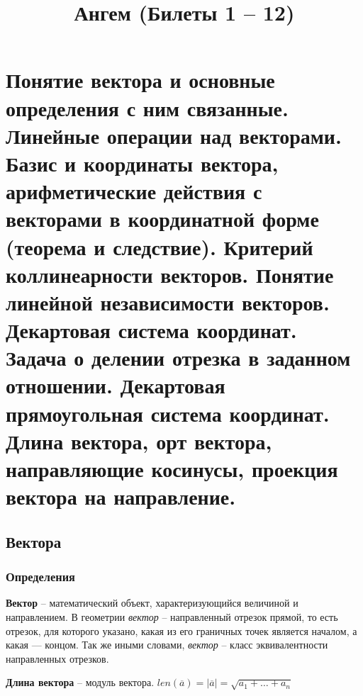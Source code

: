 \documentclass{article}
\title{Ангем (Билеты 1 -- 12)}
\begin{document}
\maketitle 
\tableofcontents

\newpage
\section{Понятие вектора и основные определения с ним связанные. Линейные операции над векторами. Базис и координаты вектора, арифметические действия с векторами в координатной форме (теорема и следствие). Критерий коллинеарности векторов. Понятие линейной независимости векторов. Декартовая система координат. Задача о делении отрезка в заданном отношении. Декартовая прямоугольная система координат. Длина вектора, орт вектора, направляющие косинусы, проекция вектора на направление.}
\subsection{Вектора}
\subsubsection{Определения}
\textbf{Вектор} -- математический объект, характеризующийся величиной и направлением. В геометрии \textit{вектор} -- направленный отрезок прямой, то есть отрезок, для которого указано, какая из его граничных точек является началом, а какая — концом. Так же иными словами, \textit{вектор} -- класс эквивалентности направленных отрезков.

\textbf{Длина вектора} -- модуль вектора. $len(\overline{a})=|\overline{a}|=\sqrt{a_1+\ldots+a_n}$
\end{document}

